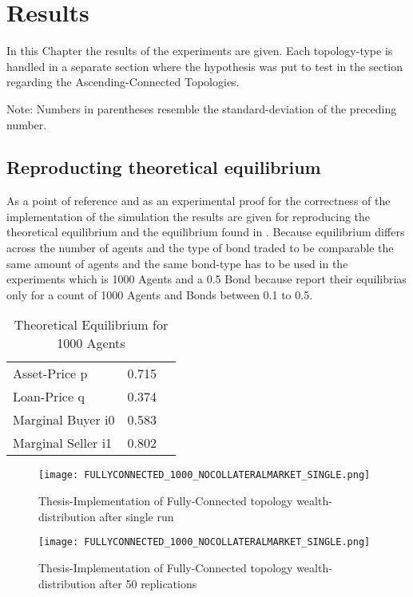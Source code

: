 \documentclass[Bachelorarbeit.tex]{subfiles}
\begin{document}
\graphicspath{{./figures/results/}}	%

\chapter{Results}

In this Chapter the results of the experiments are given. Each topology-type is handled in a separate section where the hypothesis was put to test in the section regarding the Ascending-Connected Topologies.

Note: Numbers in parentheses resemble the standard-deviation of the preceding number.

\section{Reproducting theoretical equilibrium}
As  a point of reference and as an experimental proof for the correctness of the implementation of the simulation the results are given for reproducing the theoretical equilibrium and the equilibrium found in \cite{Breuer2015}.
Because equilibrium differs across the number of agents and the type of bond traded to be comparable the same amount of agents and the same bond-type has to be used in the experiments which is 1000 Agents and a 0.5 Bond because \cite{Breuer2015} report their equilibrias only for a count of 1000 Agents and Bonds between 0.1 to 0.5.

\begin{table}[h]
	\centering
	\caption{Theoretical Equilibrium for 1000 Agents}
	\begin{tabular} { l c r }
		\hline
		Asset-Price p & 0.715 \\
		Loan-Price q & 0.374 \\
		Marginal Buyer i0 & 0.583 \\
		Marginal Seller i1 & 0.802 \\
		\hline
	\end{tabular}
\end{table}


\begin{figure}[!htbp]
	\centering
  \texttt{[image: FULLYCONNECTED\_1000\_NOCOLLATERALMARKET\_SINGLE.png]}
	\caption{Thesis-Implementation of Fully-Connected topology wealth-distribution after single run}
	\label{fig1}
\end{figure}

\begin{figure}[!htbp]
	\centering
  \texttt{[image: FULLYCONNECTED\_1000\_NOCOLLATERALMARKET\_SINGLE.png]}
	\caption{Thesis-Implementation of Fully-Connected topology wealth-distribution after 50 replications}
	\label{fig1}
\end{figure}
\end{document}
